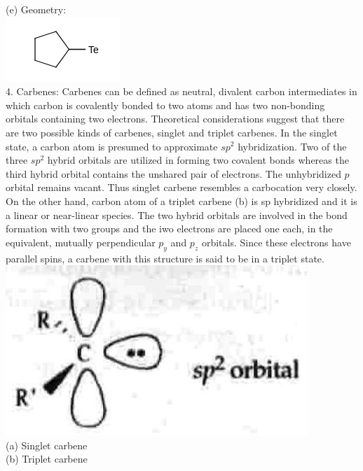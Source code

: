 \documentclass[10pt]{article}
\begin{document}
(e) Geometry:\\
\includegraphics{smile-b91b7cbb7400d04c96c55be28afaaf517034be21}\\
4. Carbenes: Carbenes can be defined as neutral, divalent carbon intermediates in which carbon is covalently bonded to two atoms and has two non-bonding orbitals containing two electrons. Theoretical considerations suggest that there are two possible kinds of carbenes, singlet and triplet carbenes. In the singlet state, a carbon atom is presumed to approximate $s p^{2}$ hybridization. Two of the three $s p^{2}$ hybrid orbitals are utilized in forming two covalent bonds whereas the third hybrid orbital contains the unshared pair of electrons. The unhybridized $p$ orbital remains vacant. Thus singlet carbene resembles a carbocation very closely. On the other hand, carbon atom of a triplet carbene (b) is sp hybridized and it is a linear or near-linear species. The two hybrid orbitals are involved in the bond formation with two groups and the iwo electrons are placed one each, in the equivalent, mutually perpendicular $p_{y}$ and $p_{z}$ orbitals. Since these electrons have parallel spins, a carbene with this structure is said to be in a triplet state.\\
\includegraphics[max width=\textwidth, center]{2025_01_28_8470952b98110cec3aabg-089(1)}\\
(a) Singlet carbene\\
(b) Triplet carbene
\end{document}
